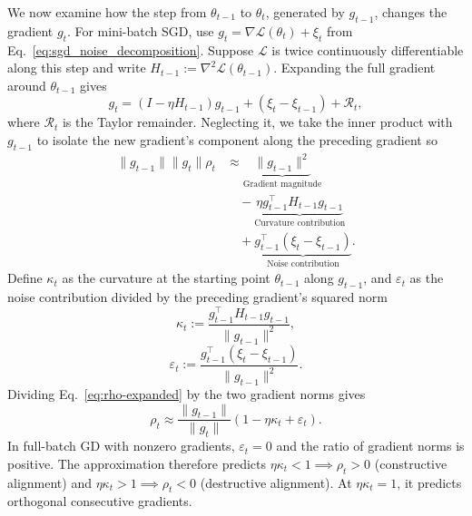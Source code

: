 We now examine how the step from $\theta_{t-1}$ to $\theta_t$, generated by $g_{t-1}$, changes the gradient $g_t$. For mini-batch SGD, use $g_t=\nabla\mathcal L(\theta_t)+\xi_t$ from Eq.~\eqref{eq:sgd_noise_decomposition}. Suppose $\mathcal L$ is twice continuously differentiable along this step and write $H_{t-1}:=\nabla^2\mathcal L(\theta_{t-1})$. Expanding the full gradient around $\theta_{t-1}$ gives
\begin{equation}
  g_t=(I-\eta H_{t-1})g_{t-1}+(\xi_t-\xi_{t-1})+\mathcal R_t,
  \label{eq:gradient-evolution}
\end{equation}
where $\mathcal R_t$ is the Taylor remainder. Neglecting it, we take the inner product with $g_{t-1}$ to isolate the new gradient's component along the preceding gradient so
\begin{equation}
\begin{aligned}
\|g_{t-1}\|\|g_t\|\rho_t
 &\approx\underbrace{\|g_{t-1}\|^2}_{\text{Gradient magnitude}}\\
 &\quad-\underbrace{\eta g_{t-1}^{\top}H_{t-1}g_{t-1}}_{\text{Curvature contribution}}\\
 &\quad+\underbrace{g_{t-1}^{\top}(\xi_t-\xi_{t-1})}_{\text{Noise contribution}}.
\end{aligned}
\label{eq:rho-expanded}
\end{equation}
Define $\kappa_t$ as the curvature at the starting point $\theta_{t-1}$ along $g_{t-1}$, and $\varepsilon_t$ as the noise contribution divided by the preceding gradient's squared norm
\begin{equation}
  \kappa_t:=\frac{g_{t-1}^\top H_{t-1}g_{t-1}}{\|g_{t-1}\|^2},
  \label{eq:kappa}
\end{equation}
\begin{equation}
  \varepsilon_t:=
  \frac{g_{t-1}^\top(\xi_t-\xi_{t-1})}{\|g_{t-1}\|^2}.
  \label{eq:epsilon}
\end{equation}
Dividing Eq.~\eqref{eq:rho-expanded} by the two gradient norms gives
\begin{equation}
  \boxed{\rho_t\approx\frac{\|g_{t-1}\|}{\|g_t\|}
                   (1-\eta\kappa_t+\varepsilon_t).}
  \label{eq:rho-normalized}
\end{equation}
In full-batch GD with nonzero gradients, $\varepsilon_t=0$ and the ratio of gradient norms is positive. The approximation therefore predicts $\eta\kappa_t<1 \implies \rho_t>0$ (constructive alignment) and $\eta\kappa_t>1 \implies \rho_t<0$ (destructive alignment). At $\eta\kappa_t=1$, it predicts orthogonal consecutive gradients.

